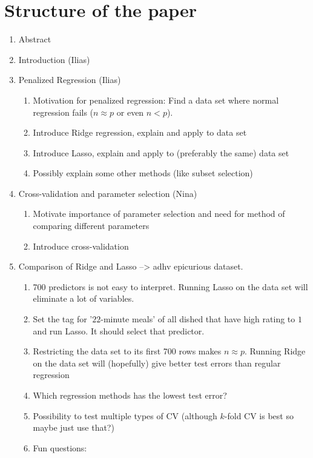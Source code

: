 \section*{Structure of the paper}
\begin{enumerate}
    \item Abstract
    \item Introduction (Ilias)
    \item Penalized Regression (Ilias)
    \begin{enumerate}
        \item Motivation for penalized regression: Find a data set where normal regression fails ($n \approx p$ or even $n < p$).
        \item Introduce Ridge regression, explain and apply to data set
        \item Introduce Lasso, explain and apply to (preferably the same) data set
        \item Possibly explain some other methods (like subset selection)
    \end{enumerate}
    \item Cross-validation and parameter selection (Nina)
    \begin{enumerate}
        \item Motivate importance of parameter selection and need for method of comparing different parameters
        \item Introduce cross-validation
    \end{enumerate}
    \item Comparison of Ridge and Lasso --> adhv epicurious dataset.
    \begin{enumerate}
        \item 700 predictors is not easy to interpret. Running Lasso on the data set will eliminate a lot of variables.
        \item Set the tag for '$22$-minute meals' of all dished that have high rating to $1$ and run Lasso. It should select that predictor.
        \item Restricting the data set to its first 700 rows makes $n \approx p$. Running Ridge on the data set will (hopefully) give better test errors than regular regression
        \item Which regression methods has the lowest test error? 
        \item Possibility to test multiple types of CV (although $k$-fold CV is best so maybe just use that?)
        \item Fun questions:

\end{enumerate}
\end{enumerate}
